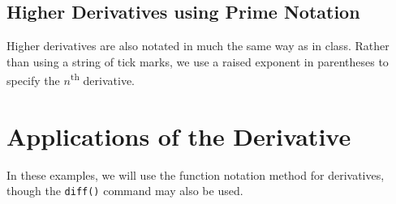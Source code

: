 \begin{maplegroup}
\begin{mapleinput}
\end{mapleinput}
\mapleresult
\begin{maplelatex}
\end{maplelatex}
\end{maplegroup}

\subsection{Higher Derivatives using Prime Notation}

Higher derivatives are also notated in much the same way as in class. Rather than using a string of tick marks, we use a raised exponent in parentheses to specify the $n$\textsuperscript{th} derivative.
\begin{maplegroup}
\begin{mapleinput}
\end{mapleinput}
\mapleresult
\begin{maplelatex}
\end{maplelatex}
\end{maplegroup}

\begin{maplegroup}
\begin{mapleinput}
\end{mapleinput}
\mapleresult
\begin{maplelatex}
\end{maplelatex}
\end{maplegroup}

\section{Applications of the Derivative}
\label{sec:Applications_of_the_derivative}

In these examples, we will use the function notation method for derivatives, though the \texttt{diff()} command may also be used.

